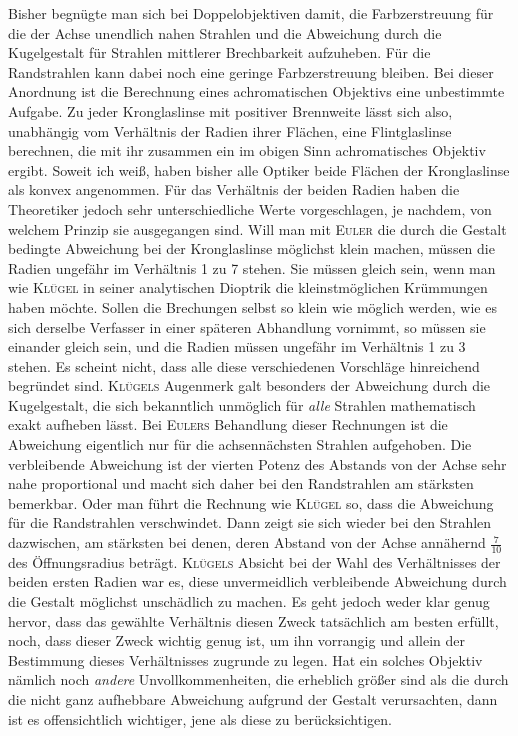 Bisher begnügte man sich bei Doppelobjektiven damit, die Farbzerstreuung für die der Achse unendlich nahen Strahlen und die Abweichung durch die Kugelgestalt für Strahlen mittlerer Brechbarkeit aufzuheben. Für die Randstrahlen kann dabei noch eine geringe Farbzerstreuung bleiben. Bei dieser Anordnung ist die Berechnung eines achromatischen Objektivs eine unbestimmte Aufgabe. Zu jeder Kronglaslinse mit positiver Brennweite lässt sich also, unabhängig vom Verhältnis der Radien ihrer Flächen, eine Flintglaslinse berechnen, die mit ihr zusammen ein im obigen Sinn achromatisches Objektiv ergibt. Soweit ich weiß, haben bisher alle Optiker beide Flächen der Kronglaslinse als konvex angenommen. Für das Verhältnis der beiden Radien haben die Theoretiker jedoch sehr unterschiedliche Werte vorgeschlagen, je nachdem, von welchem Prinzip sie ausgegangen sind. Will man mit \textsc{Euler} die durch die Gestalt bedingte Abweichung bei der Kronglaslinse möglichst klein machen, müssen die Radien ungefähr im Verhältnis
1 zu 7 stehen. Sie müssen gleich sein, wenn man wie \textsc{Klügel} in seiner analytischen Dioptrik die kleinstmöglichen Krümmungen haben möchte. Sollen die Brechungen selbst so klein wie möglich werden, wie es sich derselbe Verfasser in einer späteren Abhandlung vornimmt, so müssen sie einander gleich sein, und die Radien müssen ungefähr im Verhältnis 1 zu 3 stehen. Es scheint nicht, dass alle diese verschiedenen Vorschläge hinreichend begründet sind. \textsc{Klügels} Augenmerk galt besonders der Abweichung durch die Kugelgestalt, die sich bekanntlich unmöglich für \textit{alle} Strahlen mathematisch exakt aufheben lässt. Bei \textsc{Eulers} Behandlung dieser Rechnungen ist die Abweichung eigentlich nur für die achsennächsten Strahlen aufgehoben. Die verbleibende Abweichung ist der vierten Potenz des Abstands von der Achse sehr nahe proportional und macht sich daher bei den Randstrahlen am stärksten bemerkbar. Oder man führt die Rechnung wie \textsc{Klügel} so, dass die Abweichung für die Randstrahlen verschwindet. Dann zeigt sie sich wieder bei den Strahlen dazwischen, am stärksten bei denen, deren Abstand von der Achse annähernd $\tfrac{7}{10}$ des Öffnungsradius beträgt. \textsc{Klügels} Absicht bei der Wahl des Verhältnisses der beiden ersten Radien war es, diese unvermeidlich verbleibende Abweichung durch die Gestalt möglichst unschädlich zu machen. Es geht jedoch weder klar genug hervor, dass das gewählte Verhältnis diesen Zweck tatsächlich am besten erfüllt, noch, dass dieser Zweck wichtig genug ist, um ihn vorrangig und allein der Bestimmung dieses Verhältnisses zugrunde zu legen. Hat ein solches Objektiv nämlich noch \textit{andere} Unvollkommenheiten, die erheblich größer sind als die durch die nicht ganz aufhebbare Abweichung aufgrund der Gestalt verursachten, dann ist es offensichtlich wichtiger, jene als diese zu berücksichtigen.

